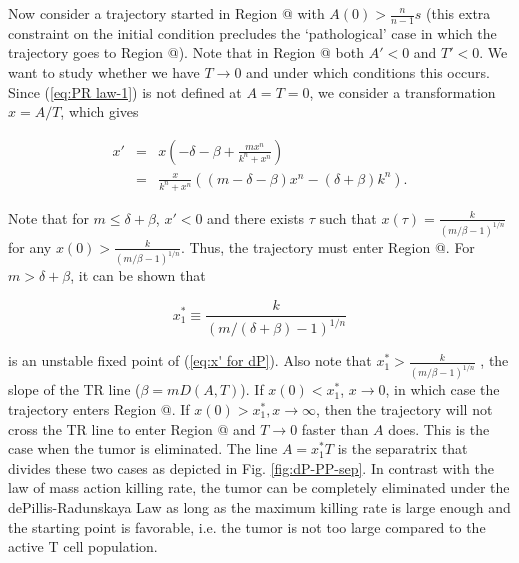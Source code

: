 \documentclass[review,authoryear]{elsarticle}
\makeatletter
\newcommand*{\rom}[1]{\expandafter\@slowromancap\romannumeral #1@}
\makeatother
\begin{document}
Now consider a trajectory started in Region \rom{1} with $A(0)>\frac{n}{n-1}s$ (this extra constraint on the initial condition precludes the `pathological' case in which the trajectory goes to Region \rom{4}).
Note that in Region \rom{1} both $A'<0$ and $T'<0$. We want to study whether we have $T\to0$ and under which conditions this occurs. Since (\ref{eq:PR law-1}) is not defined at $A=T=0$, we consider
a transformation $x=A/T$, which gives  
\begin{linenomath*}
\begin{eqnarray}
x' & = & x(-\delta-\beta+\frac{mx^{n}}{k^{n}+x^{n}})\label{eq:x' for dP}\\
 & = & \frac{x}{k^{n}+x^{n}}((m-\delta-\beta)x^{n}-(\delta+\beta)k^{n}).\nonumber 
\end{eqnarray}
\end{linenomath*}
Note that for $m\le\delta+\beta$, $x'<0$ and there exists $\tau$
such that $x(\tau)=\frac{k}{(m/\beta-1)^{1/n}}$ for any $x(0)>\frac{k}{(m/\beta-1)^{1/n}}$.
Thus, the trajectory must enter Region \rom{2}. For $m>\delta+\beta$, it can
be shown that 
\begin{linenomath*}
\[
x_{1}^{*} \equiv \frac{k}{(m/(\delta+\beta)-1)^{1/n}}
\]
\end{linenomath*}
 is an unstable fixed point of (\ref{eq:x' for dP}). Also note that
$x_{1}^{*}>\frac{k}{(m/\beta-1)^{1/n}}$ , the slope of the TR line ($\beta=mD(A,T)$).
If $x(0)<x_{1}^{*}$, $x\to0$, in which case the trajectory enters
Region \rom{2}. If $x(0)>x_{1}^{*},x\to\infty$, then the trajectory
will not cross the TR line  to enter Region \rom{2} and $T\to0$
faster than $A$ does. This is the case when the tumor is eliminated.
The line $A=x_{1}^{*}T$ is the separatrix that divides these two cases
as depicted in Fig. \ref{fig:dP-PP-sep}. In contrast with the law
of mass action killing rate, the tumor can be completely eliminated under the
dePillis-Radunskaya Law as long as the maximum killing rate is large enough
and the starting point is favorable, i.e. the tumor is not too large
compared to the active T cell population. 
\end{document}
